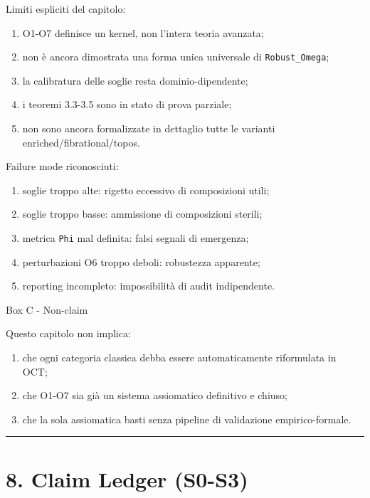 Limiti espliciti del capitolo:

\begin{enumerate}
\def\labelenumi{\arabic{enumi}.}
\tightlist
\item
  O1-O7 definisce un kernel, non l'intera teoria avanzata;
\item
  non è ancora dimostrata una forma unica universale di \texttt{Robust\_Omega};
\item
  la calibratura delle soglie resta dominio-dipendente;
\item
  i teoremi 3.3-3.5 sono in stato di prova parziale;
\item
  non sono ancora formalizzate in dettaglio tutte le varianti enriched/fibrational/topos.
\end{enumerate}

Failure mode riconosciuti:

\begin{enumerate}
\def\labelenumi{\arabic{enumi}.}
\tightlist
\item
  soglie troppo alte: rigetto eccessivo di composizioni utili;
\item
  soglie troppo basse: ammissione di composizioni sterili;
\item
  metrica \texttt{Phi} mal definita: falsi segnali di emergenza;
\item
  perturbazioni O6 troppo deboli: robustezza apparente;
\item
  reporting incompleto: impossibilità di audit indipendente.
\end{enumerate}

Box C - Non-claim

Questo capitolo non implica:

\begin{enumerate}
\def\labelenumi{\arabic{enumi}.}
\tightlist
\item
  che ogni categoria classica debba essere automaticamente riformulata in OCT;
\item
  che O1-O7 sia già un sistema assiomatico definitivo e chiuso;
\item
  che la sola assiomatica basti senza pipeline di validazione empirico-formale.
\end{enumerate}

\begin{center}\rule{0.5\linewidth}{0.5pt}\end{center}

\section{8. Claim Ledger (S0-S3)}

